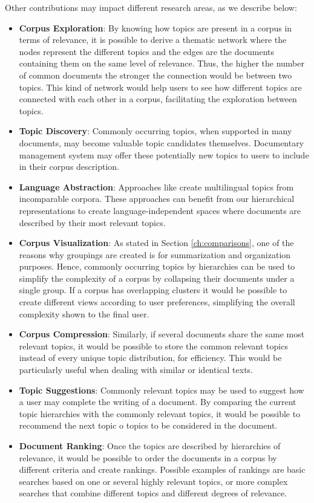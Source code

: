 Other contributions may impact different research areas, as we describe below:
\begin{itemize}
\item \textbf{Corpus Exploration}: By knowing how topics are present in a corpus in terms of relevance, it is possible to derive a thematic network where the nodes represent the different topics and the edges are the documents containing them on the same level of relevance. Thus, the higher the number of common documents the stronger the connection would be between two topics. This kind of network would help users to see how different topics are connected with each other in a corpus, facilitating the exploration between topics.
\item \textbf{Topic Discovery}: Commonly occurring topics, when supported in many documents, may become valuable topic candidates themselves. Documentary management system may offer these potentially new topics to users to include in their corpus description.
\item \textbf{Language Abstraction}: Approaches like \citep{hao-paul-2018-learning} create multilingual topics from incomparable corpora. These approaches can benefit from our hierarchical representations to create language-independent spaces where documents are described by their most relevant topics.
\item \textbf{Corpus Visualization}: As stated in Section \ref{ch:comparisons}, one of the reasons why groupings are created is for summarization and organization purposes. Hence, commonly occurring topics by hierarchies can be used to simplify the complexity of a corpus by collapsing their documents under a single group. If a corpus has overlapping clusters it would be possible to create different views according to user preferences, simplifying the overall complexity shown to the final user.
\item \textbf{Corpus Compression}: Similarly, if several documents share the same most relevant topics, it would be possible to store the common relevant topics instead of every unique topic distribution, for efficiency. This would be particularly useful when dealing with similar or identical texts.
\item \textbf{Topic Suggestions}: Commonly relevant topics may be used to suggest how a user may complete the writing of a document. By comparing the current topic hierarchies with the commonly relevant topics, it would be possible to recommend the next topic o topics to be considered in the document.
\item \textbf{Document Ranking}: Once the topics are described by hierarchies of relevance, it would be possible to order the documents in a corpus by different criteria and create rankings. Possible examples of rankings are basic searches based on one or several highly relevant topics, or more complex searches that combine different topics and different degrees of relevance.  
\end{itemize}

